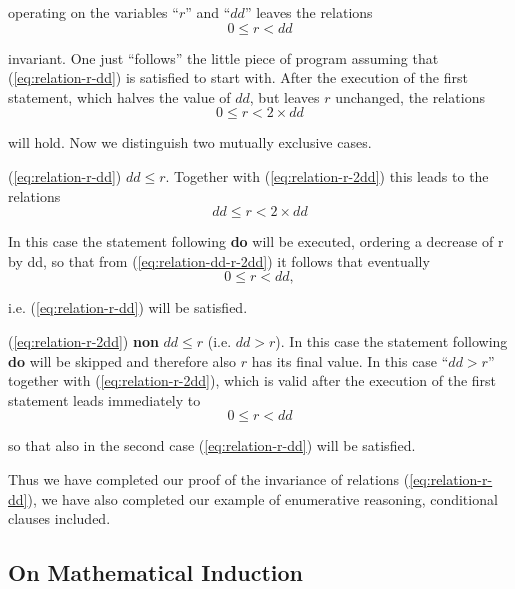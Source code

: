 \noindent
operating on the variables ``$r$'' and ``$dd$'' leaves the relations
\begin{equation}
	\label{eq:relation-r-dd}
	0 \leqslant r < dd
\end{equation}

\noindent
invariant. One just ``follows'' the little piece of program assuming that (\ref{eq:relation-r-dd}) is satisfied to start with. After the execution of the first statement, which halves the value of $dd$, but leaves $r$ unchanged, the relations
\begin{equation}
	\label{eq:relation-r-2dd}
	0 \leqslant r < 2\times dd
\end{equation}

\noindent
will hold. Now we distinguish two mutually exclusive cases.

(\ref{eq:relation-r-dd}) $dd \leqslant r$. Together with (\ref{eq:relation-r-2dd}) this leads to the relations
\begin{equation}
	\label{eq:relation-dd-r-2dd}
	dd \leqslant r < 2\times dd
\end{equation}

\noindent
In this case the statement following \textbf{do} will be executed, ordering a decrease of r by dd, so that from (\ref{eq:relation-dd-r-2dd}) it follows that eventually
\begin{equation*}
	0 \leqslant r < dd,
\end{equation*}

\noindent
i.e. (\ref{eq:relation-r-dd}) will be satisfied.

(\ref{eq:relation-r-2dd}) \textbf{non} $dd \leqslant r$ (i.e. $dd > r$). In this case the statement following \textbf{do} will be skipped and therefore also $r$ has its final value. In this case ``$dd > r$'' together with (\ref{eq:relation-r-2dd}), which is valid after the execution of the first statement leads immediately to
\begin{equation*}
	0 \leqslant r < dd
\end{equation*}

\noindent
so that also in the second case (\ref{eq:relation-r-dd}) will be satisfied.

Thus we have completed our proof of the invariance of relations (\ref{eq:relation-r-dd}), we have also completed our example of enumerative reasoning, conditional clauses included.

\subsection{On Mathematical Induction}

